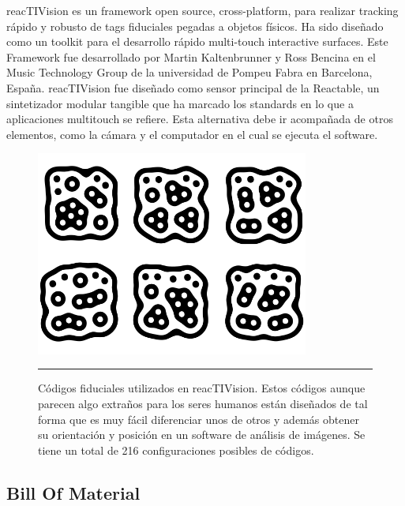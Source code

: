 reacTIVision es un framework open source, cross-platform, para realizar tracking rápido y robusto de tags fiduciales pegadas a objetos físicos. Ha sido diseñado como un toolkit para el desarrollo rápido multi-touch interactive surfaces. Este Framework fue desarrollado por Martin Kaltenbrunner y Ross Bencina en el Music Technology Group de la universidad de Pompeu Fabra en Barcelona, España. reacTIVision fue diseñado como sensor principal de la Reactable, un sintetizador modular tangible que ha marcado los standards en lo que a aplicaciones multitouch se refiere. Esta alternativa debe ir acompañada de otros elementos, como la cámara y el computador en el cual se ejecuta el software. 


\begin{figure}[htbp]
	\centering
		\includegraphics[width=0.8\textwidth]{./Figures/MODI/fiducial.png}
		\rule{35em}{0.5pt}
	\caption[Fiduciales usados como tag en reacTIVision]{Códigos fiduciales utilizados en reacTIVision. Estos códigos aunque parecen algo extraños para los seres humanos están diseñados de tal forma que es muy fácil diferenciar unos de otros y además obtener su orientación y posición en un software de análisis de imágenes. Se tiene un total de 216 configuraciones posibles de códigos.}
	\label{fig:Fiducial}
\end{figure}




\subsection{Bill Of Material}

